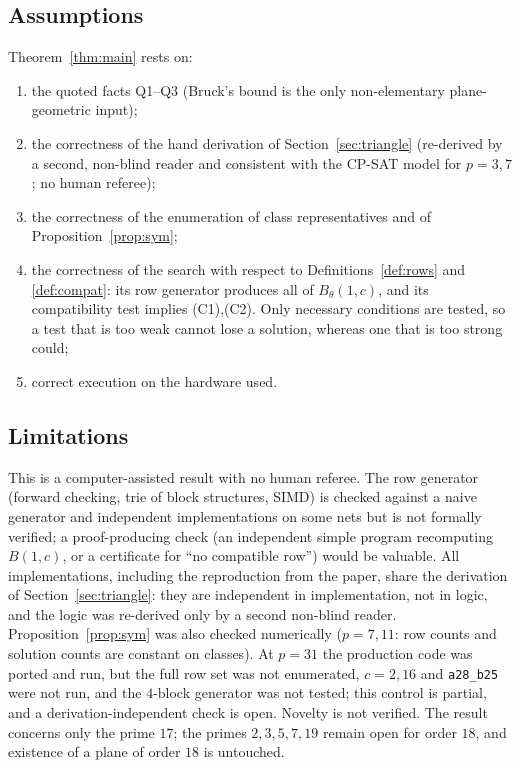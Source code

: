 \documentclass[11pt,a4paper]{article}
\theoremstyle{definition}
\begin{document}
\subsection{Assumptions}\label{sec:assumptions}
Theorem~\ref{thm:main} rests on:
\begin{enumerate}[label=\textbf{A\arabic*.},leftmargin=*,itemsep=0pt]
\item the quoted facts Q1--Q3 (Bruck's bound is the only non-elementary plane-geometric input);
\item the correctness of the hand derivation of Section~\ref{sec:triangle} (re-derived by a second, non-blind reader and consistent with the CP-SAT model for $p=3,7$; no human referee);
\item the correctness of the enumeration of class representatives and of Proposition~\ref{prop:sym};
\item the correctness of the search with respect to Definitions~\ref{def:rows} and \ref{def:compat}: its row generator produces all of $B_\theta(1,c)$, and its compatibility test implies (C1),(C2). Only necessary conditions are tested, so a test that is too weak cannot lose a solution, whereas one that is too strong could;
\item correct execution on the hardware used.
\end{enumerate}

\subsection{Limitations}
This is a computer-assisted result with no human referee. The row generator (forward checking, trie of block structures, SIMD) is checked against a naive generator and independent implementations on some nets but is not formally verified; a proof-producing check (an independent simple program recomputing $B(1,c)$, or a certificate for ``no compatible row'') would be valuable. All implementations, including the reproduction from the paper, share the derivation of Section~\ref{sec:triangle}: they are independent in implementation, not in logic, and the logic was re-derived only by a second non-blind reader. Proposition~\ref{prop:sym} was also checked numerically ($p=7,11$: row counts and solution counts are constant on classes). At $p=31$ the production code was ported and run, but the full row set was not enumerated, $c=2,16$ and \texttt{a28\_b25} were not run, and the $4$-block generator was not tested; this control is partial, and a derivation-independent check is open. Novelty is not verified. The result concerns only the prime $17$; the primes $2,3,5,7,19$ remain open for order $18$, and existence of a plane of order $18$ is untouched.
\end{document}
